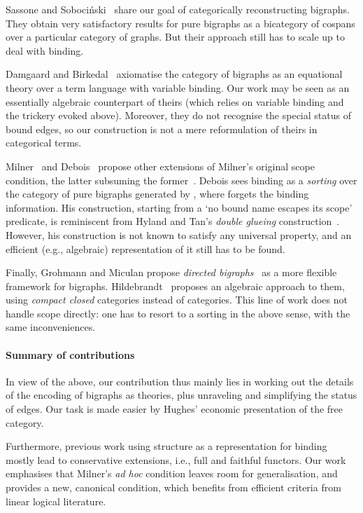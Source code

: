 \documentclass{llncs}
\begin{document}
Sassone and Soboci\'{n}ski~\cite{Sobocinski:graphslics} share our goal of
categorically reconstructing bigraphs. They obtain very satisfactory
results for pure bigraphs as a bicategory of cospans over a particular
category of graphs. But their approach still has to scale up to deal
with binding.

Damgaard and Birkedal~\cite{Birkedal} axiomatise the category of
bigraphs as an equational theory over a term language with variable
binding. Our work may be seen as an essentially algebraic counterpart
of theirs (which relies on variable binding and the trickery evoked
above).  Moreover, they do not recognise the special status of bound
edges, so our construction is not a mere reformulation of theirs in
categorical terms.

Milner~\cite{Milner:bigraphs2} and Debois~\cite{Debois:phd}
propose other extensions of Milner's original scope condition, the
latter subsuming the former~\cite[Section~6.4]{Debois:phd}.  Debois
sees binding as a \emph{sorting} over the category of pure bigraphs
generated by , where  forgets the binding information.
His construction, starting from a `no bound name escapes its scope'
predicate, is reminiscent from Hyland and Tan's \emph{double glueing}
construction~\cite{Tan:phd}. However, his construction is not known to
satisfy any universal property, and an efficient (e.g., algebraic)
representation of it still has to be found. 

Finally, Grohmann and Miculan propose \emph{directed
  bigraphs}~\cite{grohmann} as a more flexible framework for
bigraphs. Hildebrandt~\cite{Hildebrandt:choco} proposes an algebraic
approach to them, using \emph{compact closed} categories instead of
\smc{} categories. This line of work does not handle scope directly:
one has to resort to a sorting in the above sense, with the same
inconveniences.

\paragraph{Summary of contributions}
In view of the above, our contribution thus mainly lies in working out
the details of the encoding of bigraphs as \smc{} theories, plus
unraveling and simplifying the status of edges. Our task is made
easier by Hughes' economic presentation of the free \smc{} category.

Furthermore, previous work using \smc{} structure as a representation
for binding mostly lead to conservative extensions, i.e., full and
faithful functors. Our work emphasises that Milner's \emph{ad hoc}
condition leaves room for generalisation, and provides a new,
canonical condition, which benefits from efficient criteria from
linear logical literature.
\end{document}
